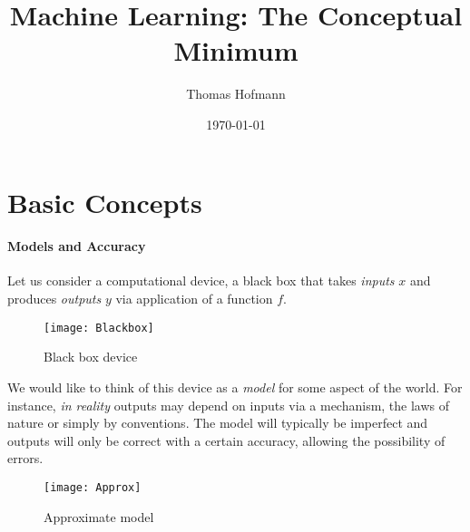 \documentclass[12pt,a4paper]{article}
\author{Thomas Hofmann}
\title{Machine Learning: The Conceptual Minimum }
\date{\today}
\begin{document}
\maketitle

\section{Basic Concepts}

\paragraph*{Models and  Accuracy}

Let us consider a computational device, a black box that takes \textit{inputs} $x$ and produces \textit{outputs} $y$ via application of a function $f$.
\begin{figure}[h]
    \centering
    \texttt{[image: Blackbox]}
    \caption{Black box device}
    \label{fig:black-box-device}
\end{figure}

\noindent We would like to think of this device as a \textit{model} for some aspect of the world. For instance, \textit{in reality} outputs may depend on inputs via a mechanism, the laws of nature or simply by conventions. The model will typically be imperfect and outputs will only be correct with a certain accuracy, allowing the possibility of errors.
\begin{figure}[h]
    \centering
    \texttt{[image: Approx]}
    \caption{Approximate model}
    \label{fig:approximate-model}
\end{figure}
\end{document}
